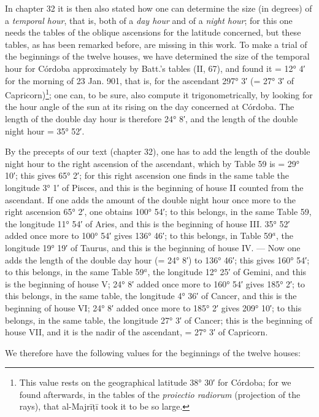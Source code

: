 \documentclass[11pt]{article}
\newcommand{\Pg}[1]{\marginpar{\footnotesize\color{gray}#1}}
\begin{document}
\par In chapter 32 it is then also stated how one can determine the size (in degrees) of a \emph{temporal hour}, that is, both of a \emph{day hour} and of a \emph{night hour}; for this one needs the tables of the oblique ascensions for the latitude concerned, but these tables, as has been remarked before, are missing in this work. To make a trial of the beginnings of the twelve houses, we have determined the size of the temporal hour for Córdoba approximately by Batt.'s tables (II, 67), and found it = 12° 4′ for the morning of 23 Jan. 901, that is, for the ascendant 297° 3′ (= 27° 3′ of Capricorn)\footnote{This value rests on the geographical latitude 38° 30′ for Córdoba; for we found afterwards, in the tables of the \emph{proiectio radiorum} (projection of the rays), that al-Majrīṭī took it to be so large.}; one can, to be sure, also compute it trigonometrically, by looking for the hour angle of the sun at its rising on the day concerned at Córdoba. The length of the double day hour is therefore 24° 8′, and the length of the double night hour = 35° 52′.\par
\par \Pg{98}By the precepts of our text (chapter 32), one has to add the length of the double night hour to the right ascension of the ascendant, which by Table 59 is = 29° 10′; this gives 65° 2′; for this right ascension one finds in the same table the longitude 3° 1′ of Pisces, and this is the beginning of house II counted from the ascendant. If one adds the amount of the double night hour once more to the right ascension 65° 2′, one obtains 100° 54′; to this belongs, in the same Table 59, the longitude 11° 54′ of Aries, and this is the beginning of house III. 35° 52′ added once more to 100° 54′ gives 136° 46′; to this belongs, in Table 59$^{a}$, the longitude 19° 19′ of Taurus, and this is the beginning of house IV. — Now one adds the length of the double day hour (= 24° 8′) to 136° 46′; this gives 160° 54′; to this belongs, in the same Table 59$^{a}$, the longitude 12° 25′ of Gemini, and this is the beginning of house V; 24° 8′ added once more to 160° 54′ gives 185° 2′; to this belongs, in the same table, the longitude 4° 36′ of Cancer, and this is the beginning of house VI; 24° 8′ added once more to 185° 2′ gives 209° 10′; to this belongs, in the same table, the longitude 27° 3′ of Cancer; this is the beginning of house VII, and it is the nadir of the ascendant, = 27° 3′ of Capricorn.\par
\par We therefore have the following values for the beginnings of the twelve houses:\par
\end{document}
